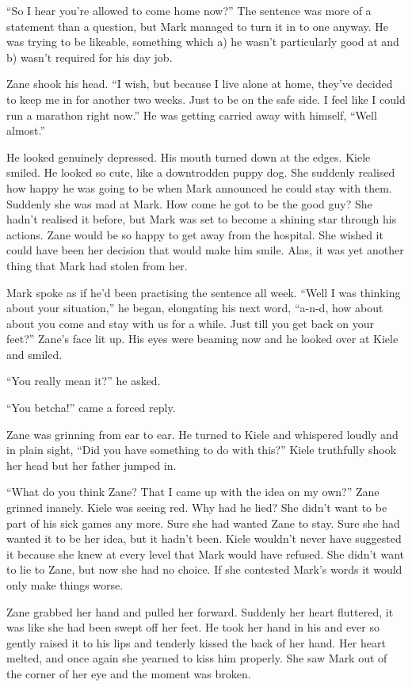 ``So I hear you're allowed to come home now?'' The sentence was more of a statement than a question, but Mark managed to turn it in to one anyway.  He was trying to be likeable, something which a) he wasn't particularly good at and b) wasn't required for his day job.

Zane shook his head.  ``I wish, but because I live alone at home, they've decided to keep me in for another two weeks.  Just to be on the safe side.  I feel like I could run a marathon right now.''  He was getting carried away with himself, ``Well almost.''

He looked genuinely depressed.  His mouth turned down at the edges.  Kiele smiled.  He looked so cute, like a downtrodden puppy dog.  She suddenly realised how happy he was going to be when Mark announced he could stay with them.  Suddenly she was mad at Mark.  How come he got to be the good guy?  She hadn't realised it before, but Mark was set to become a shining star through his actions.  Zane would be so happy to get away from the hospital.  She wished it could have been her decision that would make him smile.  Alas, it was yet another thing that Mark had stolen from her.

Mark spoke as if he'd been practising the sentence all week.  ``Well I was thinking about your situation,'' he began, elongating his next word, ``a-n-d, how about about you come and stay with us for a while.  Just till you get back on your feet?''  Zane's face lit up.  His eyes were beaming now and he looked over at Kiele and smiled.  

``You really mean it?'' he asked.

``You betcha!'' came a forced reply. 

Zane was grinning from ear to ear.  He turned to Kiele and whispered loudly and in plain sight, ``Did you have something to do with this?''  Kiele truthfully shook her head but her father jumped in.

``What do you think Zane?  That I came up with the idea on my own?''  Zane grinned inanely.  Kiele was seeing red.  Why had he lied?  She didn't want to be part of his sick games any more.  Sure she had wanted Zane to stay.  Sure she had wanted it to be her idea, but it hadn't been.  Kiele wouldn't never have suggested it because she knew at every level that Mark would have refused.  She didn't want to lie to Zane, but now she had no choice.  If she contested Mark's words it would only make things worse.

Zane grabbed her hand and pulled her forward.  Suddenly her heart fluttered, it was like she had been swept off her feet.  He took her hand in his and ever so gently raised it to his lips and tenderly kissed the back of her hand.  Her heart melted, and once again she yearned to kiss him properly.  She saw Mark out of the corner of her eye and the moment was broken.  


